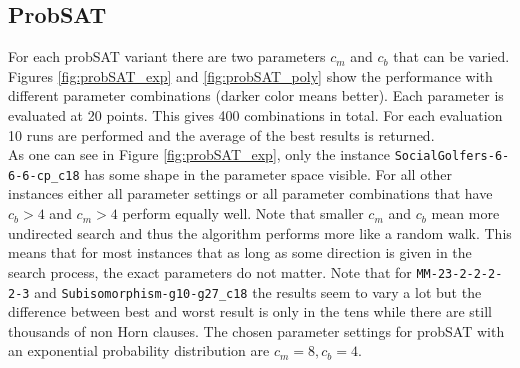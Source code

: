 \documentclass[12pt,a4paper]{article}
\begin{document}
\subsection{ProbSAT}
For each probSAT variant there are two parameters $c_m$ and $c_b$ that can be varied. Figures \ref{fig:probSAT_exp} and \ref{fig:probSAT_poly} show the performance with different parameter combinations (darker color means better). Each parameter is evaluated at 20 points. This gives 400 combinations in total. For each evaluation 10 runs are performed and the average of the best results is returned. \\

As one can see in Figure \ref{fig:probSAT_exp}, only the instance \texttt{SocialGolfers-6-6-6-cp\_c18} has some shape in the parameter space visible. For all other instances either all parameter settings or all parameter combinations that have $c_b > 4$ and $c_m > 4$ perform equally well. Note that smaller $c_m$ and $c_b$ mean more undirected search and thus the algorithm performs more like a random walk. This means that for most instances that as long as some direction is given in the search process, the exact parameters do not matter. Note that for \texttt{MM-23-2-2-2-2-3} and \texttt{Subisomorphism-g10-g27\_c18} the results seem to vary a lot but the difference between best and worst result is only in the tens while there are still thousands of non Horn clauses. The chosen parameter settings for probSAT with an exponential probability distribution are $c_m = 8, c_b=4$.\\
\end{document}
